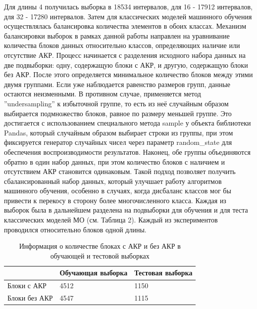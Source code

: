 \documentclass[spec, och, diploma]{SCWorks}
\begin{document}
        Для длины 4 получилась выборка в 18534 интервалов, для 16 - 17912
        интервалов, для 32 - 17280 интервалов. Затем для классических моделей
        машинного обучения осуществлялась балансировка количества элементов в
        обоих классах. Механизм балансировки выборок в рамках данной работы
        направлен на уравнивание количества блоков данных относительно классов,
        определяющих наличие или отсутствие АКР. Процесс начинается с разделения
        исходного набора данных на две подвыборки: одну, содержащую блоки с АКР,
        и другую, содержащую блоки без АКР. После этого определяется минимальное
        количество блоков между этими двумя группами. Если уже наблюдается
        равенство размеров групп, данные остаются неизменными. В противном
        случае, применяется метод ''undersampling'' к избыточной группе, то есть
        из неё случайным образом выбирается подмножество блоков, равное по
        размеру меньшей группе. Это достигается с использованием специального
        метода sample у объекта библиотеки Pandas, который случайным образом
        выбирает строки из группы, при этом фиксируется генератор случайных
        чисел через параметр random_state для обеспечения воспроизводимости
        результатов. Наконец, обе группы объединяются обратно в один набор
        данных, при этом количество блоков с наличием и отсутствием АКР
        становится одинаковым. Такой подход позволяет получить сбалансированный
        набор данных, который улучшает работу алгоритмов машинного обучения,
        особенно в случаях, когда дисбаланс классов мог бы привести к перекосу в
        сторону более многочисленного класса. Каждая из выборок была в
        дальнейшем разделена на подвыборки для обучения и для теста классических
        моделей МО (см. Таблица 2). Каждый из экспериментов проводился
        относительно блоков одной длины.

        \begin{table}[h]
            \centering
            \begin{tabular}{l|l|l|}
            \cline{2-3}
                                                & Обучающая выборка & Тестовая выборка \\ \hline
            \multicolumn{1}{|l|}{Блоки с АКР}   & 4512              & 1150             \\ \hline
            \multicolumn{1}{|l|}{Блоки без АКР} & 4547              & 1115             \\ \hline
            \end{tabular}
            \captionsetup{justification=centering}
            \caption{Информация о количестве блоках с АКР и без АКР в обучающей и тестовой выборках}
        \end{table}        
\end{document}
